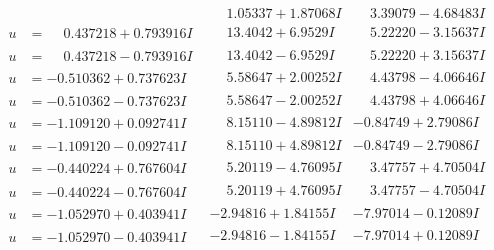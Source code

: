 \documentclass[1p]{elsarticle_modified}
\theoremstyle{definition}
\begin{document}
$$\begin{array}{c|c|c}
 & \phantom{-}1.05337 + 1.87068 I & \phantom{-}3.39079 - 4.68483 I \\ \hline\begin{aligned}
u &= \phantom{-}0.437218 + 0.793916 I\end{aligned}
 & \phantom{-}13.4042 + 6.9529 I & \phantom{-}5.22220 - 3.15637 I \\ \hline\begin{aligned}
u &= \phantom{-}0.437218 - 0.793916 I\end{aligned}
 & \phantom{-}13.4042 - 6.9529 I & \phantom{-}5.22220 + 3.15637 I \\ \hline\begin{aligned}
u &= -0.510362 + 0.737623 I\end{aligned}
 & \phantom{-}5.58647 + 2.00252 I & \phantom{-}4.43798 - 4.06646 I \\ \hline\begin{aligned}
u &= -0.510362 - 0.737623 I\end{aligned}
 & \phantom{-}5.58647 - 2.00252 I & \phantom{-}4.43798 + 4.06646 I \\ \hline\begin{aligned}
u &= -1.109120 + 0.092741 I\end{aligned}
 & \phantom{-}8.15110 - 4.89812 I & -0.84749 + 2.79086 I \\ \hline\begin{aligned}
u &= -1.109120 - 0.092741 I\end{aligned}
 & \phantom{-}8.15110 + 4.89812 I & -0.84749 - 2.79086 I \\ \hline\begin{aligned}
u &= -0.440224 + 0.767604 I\end{aligned}
 & \phantom{-}5.20119 - 4.76095 I & \phantom{-}3.47757 + 4.70504 I \\ \hline\begin{aligned}
u &= -0.440224 - 0.767604 I\end{aligned}
 & \phantom{-}5.20119 + 4.76095 I & \phantom{-}3.47757 - 4.70504 I \\ \hline\begin{aligned}
u &= -1.052970 + 0.403941 I\end{aligned}
 & -2.94816 + 1.84155 I & -7.97014 - 0.12089 I \\ \hline\begin{aligned}
u &= -1.052970 - 0.403941 I\end{aligned}
 & -2.94816 - 1.84155 I & -7.97014 + 0.12089 I \\ \hline\begin{aligned}

\end{aligned}
\end{array}$$
\end{document}
